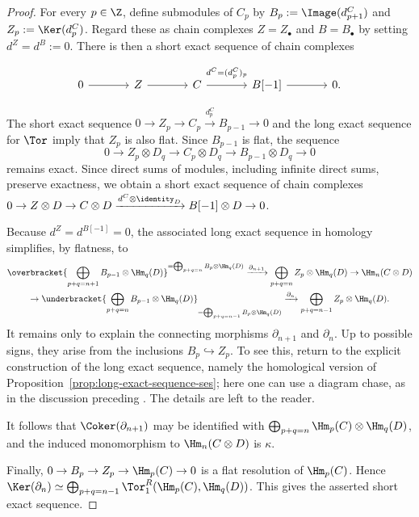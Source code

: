 \begin{proof}
For every $p\in\Z$, define submodules of $C_p$ by
$B_p:=\Image(d^C_{p+1})$ and $Z_p:=\Ker(d^C_p)$. Regard these as chain
complexes $Z=Z_\bullet$ and $B=B_\bullet$ by setting $d^Z=d^B:=0$.
There is then a short exact sequence of chain complexes
\[
\begin{tikzcd}[column sep=large]
0 \arrow[r] & Z \arrow[r] & C \arrow[r, "{d^C=(d^C_p)_p}" inner sep=0.6em]
& B[-1] \arrow[r] & 0.
\end{tikzcd}
\]

The short exact sequence
$0\to Z_p\to C_p\xrightarrow{d^C_p}B_{p-1}\to0$ and the long exact sequence
for $\Tor$ imply that $Z_p$ is also flat. Since $B_{p-1}$ is flat, the
sequence
\[
0\to Z_p\otimes D_q\to C_p\otimes D_q\to B_{p-1}\otimes D_q\to0
\]
remains exact. Since direct sums of modules, including infinite direct sums,
preserve exactness, we obtain a short exact sequence of chain complexes
$0\to Z\otimes D\to C\otimes D\xrightarrow{d^C\otimes\identity_D}
B[-1]\otimes D\to0$.

Because $d^Z=d^{B[-1]}=0$, the associated long exact sequence in homology
simplifies, by flatness, to
\begin{multline*}
\overbracket{\displaystyle\bigoplus_{p+q=n+1}B_{p-1}\otimes\Hm_q(D)}^{=
\bigoplus_{p+q=n}B_p\otimes\Hm_q(D)}\xrightarrow{\partial_{n+1}}
\displaystyle\bigoplus_{p+q=n}Z_p\otimes\Hm_q(D)\to\Hm_n(C\otimes D)\\
\to\underbracket{\displaystyle\bigoplus_{p+q=n}B_{p-1}\otimes\Hm_q(D)}_{=
\bigoplus_{p+q=n-1}B_p\otimes\Hm_q(D)}\xrightarrow{\partial_n}
\displaystyle\bigoplus_{p+q=n-1}Z_p\otimes\Hm_q(D).
\end{multline*}
It remains only to explain the connecting morphisms $\partial_{n+1}$ and
$\partial_n$. Up to possible signs, they arise from the inclusions
$B_p\hookrightarrow Z_p$. To see this, return to the explicit construction
of the long exact sequence, namely the homological version of
Proposition~\ref{prop:long-exact-sequence-ses}; here one can use a diagram
chase, as in the discussion preceding \cite[Proposition 6.8.6]{Li1}. The
details are left to the reader.

It follows that $\Coker(\partial_{n+1})$ may be identified with
$\bigoplus_{p+q=n}\Hm_p(C)\otimes\Hm_q(D)$, and the induced monomorphism to
$\Hm_n(C\otimes D)$ is $\kappa$.

Finally, $0\to B_p\to Z_p\to\Hm_p(C)\to0$ is a flat resolution of
$\Hm_p(C)$. Hence
$\Ker(\partial_n)\simeq
\bigoplus_{p+q=n-1}\Tor_1^R(\Hm_p(C),\Hm_q(D))$. This gives the asserted
short exact sequence.
\end{proof}

